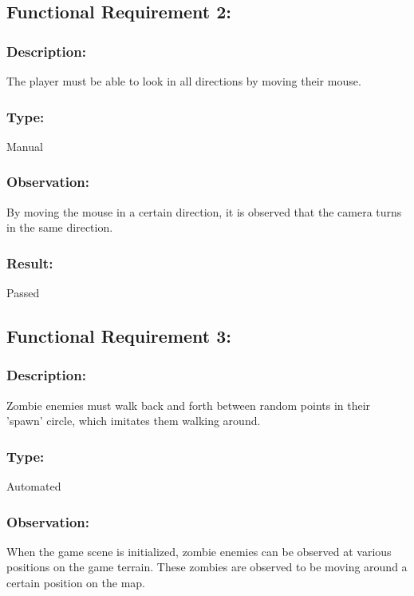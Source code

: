\documentclass[12pt, titlepage]{article}
\begin{document}
\subsection{Functional Requirement 2: } 

\subsubsection{Description: }The player must be able to look in all directions by moving their mouse.

\subsubsection{Type: } Manual

\subsubsection{Observation: } By moving the mouse in a certain direction, it is observed that the camera turns in the same direction.

\subsubsection[Pass / Fail:] {Result: } Passed


\subsection{Functional Requirement 3: } 

\subsubsection{Description: }Zombie enemies must walk back and forth between random points in their 'spawn' circle, which imitates them walking around.

\subsubsection{Type: } Automated

\subsubsection{Observation: } When the game scene is initialized, zombie enemies can be observed at various positions on the game terrain. These zombies are observed to be moving around a certain position on the map.
\end{document}
